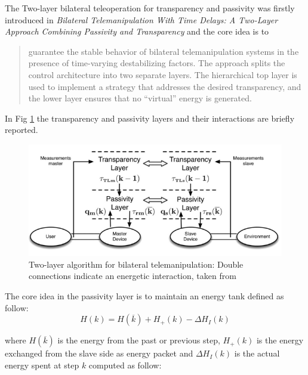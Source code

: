\documentclass[a4paper,12pt]{article}
\begin{document}
The Two-layer bilateral teleoperation for transparency and passivity was firstly introduced in \textit{Bilateral Telemanipulation With Time Delays:
A Two-Layer Approach Combining Passivity
and Transparency} and the core idea is to
 \begin{quote}
guarantee the stable behavior of bilateral telemanipulation systems in the presence of time-varying destabilizing factors. The approach splits the control architecture into two separate layers. The hierarchical top layer is used
to implement a strategy that addresses the desired transparency,
and the lower layer ensures that no “virtual” energy is generated.
\end{quote}
In Fig \ref{fig:layer} the transparency and passivity layers and their interactions are briefly reported.
\begin{figure}[H]
    \begin{center}
        \includegraphics[scale=0.6]{images/layer.png}
    \end{center}
    \caption{Two-layer algorithm for bilateral telemanipulation: Double connections indicate an energetic interaction, taken from \cite{Franken11}}
    \label{fig:layer}
\end{figure}

The core idea in the passivity layer is to maintain an energy tank defined as follow:
\[
    H(k) = H(\overline{k}) + H_{+}(k) - \Delta H_I(k)
\]

where $H(\overline{k})$ is the energy from the past or previous step, $ H_{+}(k)$ is the energy exchanged from the slave side as energy packet and $\Delta H_I(k)$ is the actual energy spent at step $k$ computed as follow:
\end{document}
